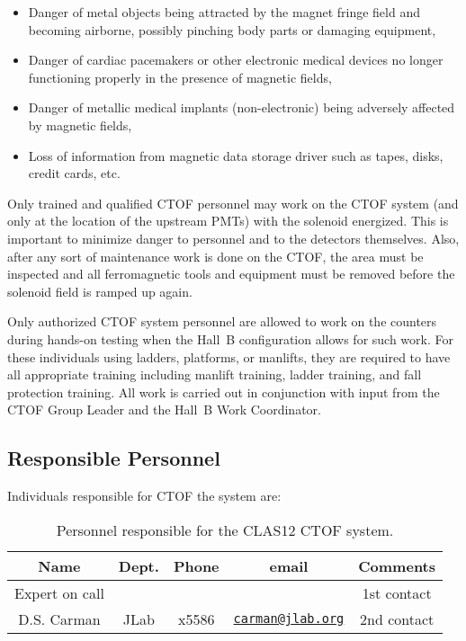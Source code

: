 \begin{itemize}
\item Danger of metal objects being attracted by the magnet fringe field and becoming airborne, 
possibly pinching body parts or damaging equipment,
\item Danger of cardiac pacemakers or other electronic medical devices no longer functioning 
properly in the presence of magnetic fields,
\item Danger of metallic medical implants (non-electronic) being adversely affected by magnetic 
fields,
\item Loss of information from magnetic data storage driver such as tapes, disks, credit cards, 
etc.
\end{itemize}

Only trained and qualified CTOF personnel may work on the CTOF system (and only at the location
of the upstream PMTs) with the solenoid energized. This is important to minimize danger to
personnel and to the detectors themselves. Also, after any sort of maintenance work is done on 
the CTOF, the area must be inspected and all ferromagnetic tools and equipment must be removed 
before the solenoid field is ramped up again.

Only authorized CTOF system personnel are allowed to work on the counters during hands-on
testing when the Hall~B configuration allows for such work. For these individuals using ladders,
platforms, or manlifts, they are required to have all appropriate training including manlift 
training, ladder training, and fall protection training. All work is carried out in conjunction 
with input from the CTOF Group Leader and the Hall~B Work Coordinator.

\subsection{Responsible Personnel}

Individuals responsible for CTOF the system are:

\begin{table}[htbp]
\centering
\begin{tabular}{|c|c|c|c|c|} \hline
Name           & Dept. & Phone & email & Comments \\ \hline
Expert on call &       &       &       & 1st contact \\ \hline
D.S. Carman    & JLab  & x5586 & \href{mailto:carman@jlab.org}{\nolinkurl{carman@jlab.org}} & 2nd contact \\ \hline
\end{tabular}
\caption{Personnel responsible for the CLAS12 CTOF system.} 
\label{tb:ctof}
\end{table}

\vfil
\eject
